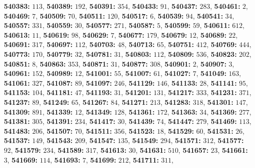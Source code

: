 \textsf{\bfseries 540383:} $113$, \textsf{\bfseries 540389:} $192$, \textsf{\bfseries 540391:} $354$, \textsf{\bfseries 540433:} $91$, \textsf{\bfseries 540437:} $283$, \textsf{\bfseries 540461:} $2$, \textsf{\bfseries 540469:} $7$, \textsf{\bfseries 540509:} $70$, \textsf{\bfseries 540511:} $120$, \textsf{\bfseries 540517:} $6$, \textsf{\bfseries 540539:} $94$, \textsf{\bfseries 540541:} $34$, \textsf{\bfseries 540557:} $331$, \textsf{\bfseries 540559:} $30$, \textsf{\bfseries 540577:} $271$, \textsf{\bfseries 540587:} $5$, \textsf{\bfseries 540599:} $59$, \textsf{\bfseries 540611:} $612$, \textsf{\bfseries 540613:} $11$, \textsf{\bfseries 540619:} $98$, \textsf{\bfseries 540629:} $7$, \textsf{\bfseries 540677:} $179$, \textsf{\bfseries 540679:} $12$, \textsf{\bfseries 540689:} $22$, \textsf{\bfseries 540691:} $317$, \textsf{\bfseries 540697:} $112$, \textsf{\bfseries 540703:} $48$, \textsf{\bfseries 540713:} $65$, \textsf{\bfseries 540751:} $412$, \textsf{\bfseries 540769:} $444$, \textsf{\bfseries 540773:} $170$, \textsf{\bfseries 540779:} $32$, \textsf{\bfseries 540781:} $31$, \textsf{\bfseries 540803:} $112$, \textsf{\bfseries 540809:} $536$, \textsf{\bfseries 540823:} $202$, \textsf{\bfseries 540851:} $8$, \textsf{\bfseries 540863:} $353$, \textsf{\bfseries 540871:} $31$, \textsf{\bfseries 540877:} $308$, \textsf{\bfseries 540901:} $2$, \textsf{\bfseries 540907:} $3$, \textsf{\bfseries 540961:} $152$, \textsf{\bfseries 540989:} $12$, \textsf{\bfseries 541001:} $55$, \textsf{\bfseries 541007:} $61$, \textsf{\bfseries 541027:} $7$, \textsf{\bfseries 541049:} $163$, \textsf{\bfseries 541061:} $327$, \textsf{\bfseries 541087:} $89$, \textsf{\bfseries 541097:} $246$, \textsf{\bfseries 541129:} $146$, \textsf{\bfseries 541133:} $28$, \textsf{\bfseries 541141:} $95$, \textsf{\bfseries 541153:} $104$, \textsf{\bfseries 541181:} $47$, \textsf{\bfseries 541193:} $31$, \textsf{\bfseries 541201:} $131$, \textsf{\bfseries 541217:} $333$, \textsf{\bfseries 541231:} $371$, \textsf{\bfseries 541237:} $89$, \textsf{\bfseries 541249:} $65$, \textsf{\bfseries 541267:} $84$, \textsf{\bfseries 541271:} $213$, \textsf{\bfseries 541283:} $318$, \textsf{\bfseries 541301:} $147$, \textsf{\bfseries 541309:} $891$, \textsf{\bfseries 541339:} $12$, \textsf{\bfseries 541349:} $128$, \textsf{\bfseries 541361:} $172$, \textsf{\bfseries 541363:} $34$, \textsf{\bfseries 541369:} $277$, \textsf{\bfseries 541381:} $305$, \textsf{\bfseries 541391:} $234$, \textsf{\bfseries 541417:} $30$, \textsf{\bfseries 541439:} $74$, \textsf{\bfseries 541447:} $279$, \textsf{\bfseries 541469:} $113$, \textsf{\bfseries 541483:} $206$, \textsf{\bfseries 541507:} $70$, \textsf{\bfseries 541511:} $356$, \textsf{\bfseries 541523:} $18$, \textsf{\bfseries 541529:} $60$, \textsf{\bfseries 541531:} $26$, \textsf{\bfseries 541537:} $149$, \textsf{\bfseries 541543:} $209$, \textsf{\bfseries 541547:} $135$, \textsf{\bfseries 541549:} $294$, \textsf{\bfseries 541571:} $312$, \textsf{\bfseries 541577:} $92$, \textsf{\bfseries 541579:} $234$, \textsf{\bfseries 541589:} $317$, \textsf{\bfseries 541613:} $30$, \textsf{\bfseries 541631:} $510$, \textsf{\bfseries 541657:} $23$, \textsf{\bfseries 541661:} $3$, \textsf{\bfseries 541669:} $114$, \textsf{\bfseries 541693:} $7$, \textsf{\bfseries 541699:} $212$, \textsf{\bfseries 541711:} $311$, 
